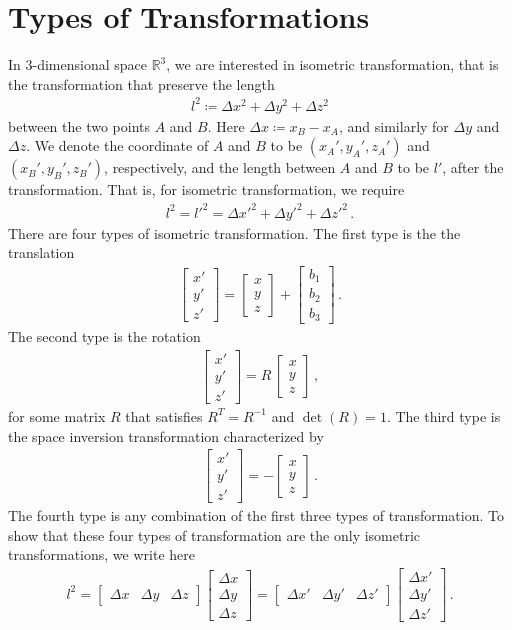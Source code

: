 \documentclass[11pt, onesided]{book}
\theoremstyle{break}
\theoremstyle{break}
\newcommand{\R}{\mathbb{R}}
\newcommand{\bmat}[1]{\begin{bmatrix} #1 \end{bmatrix}}
\begin{document}
\section[Types of Transformations]{\color{red} Types of Transformations\color{black}}
In $3$-dimensional space $\R^3$, we are interested in isometric transformation, that is the transformation that preserve the length
\begin{align*}
l^2 \coloneqq \Delta x^2 + \Delta y^2 + \Delta z^2
\end{align*}
between the two points $A$ and $B$. Here $\Delta x \coloneqq x_B - x_A$, and similarly for $\Delta y$ and $\Delta z$. We denote the coordinate of $A$ and $B$ to be $(x_A',y_A',z_A')$ and $(x_B', y_B', z_B')$, respectively, and the length between $A$ and $B$ to be $l'$, after the transformation. That is, for isometric transformation, we require
\begin{align*}
l^2 = l'^2 = \Delta x'^2 + \Delta y'^2 + \Delta z'^2\,.
\end{align*}
There are four types of isometric transformation. The first type is the the translation
\begin{align*}
\bmat{x' \\ y' \\ z'} = \bmat{x \\ y \\ z} + \bmat{b_1 \\ b_2 \\ b_3}\,.
\end{align*}
The second type is the rotation
\begin{align*}
\bmat{x' \\ y' \\ z'} = R\, \bmat{x \\ y \\ z} \,,
\end{align*}
for some matrix $R$ that satisfies $R^T = R^{-1}$ and $\det(R) = 1$. The third type is the space inversion transformation characterized by
\begin{align*}
\bmat{x' \\ y' \\ z'} = - \bmat{x \\ y \\ z}\,.
\end{align*}
The fourth type is any combination of the first three types of transformation. To show that these four types of transformation are the only isometric transformations, we write here
\begin{align*}
l^2 = \bmat{\Delta x & \Delta y & \Delta z} \bmat{\Delta x \\ \Delta y \\ \Delta z} = \bmat{\Delta x' & \Delta y' & \Delta z'} \bmat{\Delta x'\\ \Delta y' \\ \Delta z'} \,.
\end{align*}
\end{document}
